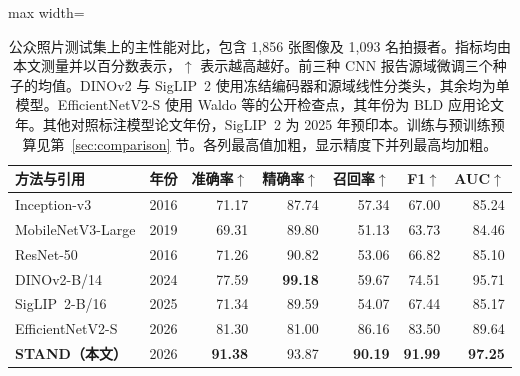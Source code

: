 \begin{table}[htbp]
\centering\small
\caption{公众照片测试集上的主性能对比，包含 1,856 张图像及 1,093 名拍摄者。指标均由本文测量并以百分数表示，$\uparrow$ 表示越高越好。前三种 CNN 报告源域微调三个种子的均值。DINOv2 与 SigLIP~2 使用冻结编码器和源域线性分类头，其余均为单模型。EfficientNetV2-S 使用 Waldo 等的公开检查点，其年份为 BLD 应用论文年。其他对照标注模型论文年份，SigLIP~2 为 2025 年预印本。训练与预训练预算见第~\ref{sec:comparison} 节。各列最高值加粗，显示精度下并列最高均加粗。}
\label{tab:external}
\begin{adjustbox}{max width=\linewidth}
\begin{tabular}{lrrrrrr}
\toprule
方法与引用 & 年份 & 准确率$\uparrow$ & 精确率$\uparrow$ & 召回率$\uparrow$ & F1$\uparrow$ & AUC$\uparrow$\\
\midrule
Inception-v3\cite{szegedy2016} & 2016 & 71.17 & 87.74 & 57.34 & 67.00 & 85.24\\
MobileNetV3-Large\cite{howard2019} & 2019 & 69.31 & 89.80 & 51.13 & 63.73 & 84.46\\
ResNet-50\cite{he2016} & 2016 & 71.26 & 90.82 & 53.06 & 66.82 & 85.10\\
DINOv2-B/14\cite{oquab2024} & 2024 & 77.59 & \textbf{99.18} & 59.67 & 74.51 & 95.71\\
SigLIP~2-B/16\cite{tschannen2025} & 2025 & 71.34 & 89.59 & 54.07 & 67.44 & 85.17\\
EfficientNetV2-S\cite{waldo2026} & 2026 & 81.30 & 81.00 & 86.16 & 83.50 & 89.64\\
\midrule
\textbf{STAND（本文）} & 2026 & \textbf{91.38} & 93.87 & \textbf{90.19} & \textbf{91.99} & \textbf{97.25}\\
\bottomrule
\end{tabular}
\end{adjustbox}
\end{table}
